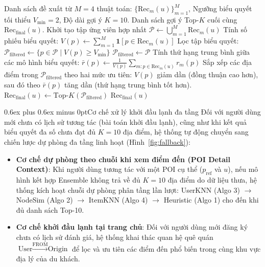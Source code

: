 \documentclass[journal,onecolumn,10pt]{IEEEtran}
\makeatletter
\def\subsection{\@startsection{subsection}{2}{\z@}{1.8ex plus 1.0ex minus 0.3ex}%
{0.6ex plus 0.6ex minus 0pt}{\normalfont\normalsize\bfseries}}
\makeatother
\begin{document}
\begin{algorithm}[htbp]
\caption{Cơ chế biểu quyết đa số và xếp hạng trung bình (Majority Consensus and Mean-Rank Fusion)}
\label{alg:ensemble}
\begin{algorithmic}[1]
\REQUIRE Danh sách đề xuất từ $M=4$ thuật toán: $\{\text{Rec}_m(u)\}_{m=1}^M$, Ngưỡng biểu quyết tối thiểu $V_{\text{min}}=2$, Độ dài gợi ý $K=10$.
\ENSURE Danh sách gợi ý Top-$K$ cuối cùng $\text{Rec}_{\text{final}}(u)$.
\STATE Khởi tạo tập ứng viên hợp nhất $\mathcal{P} \leftarrow \bigcup_{m=1}^M \text{Rec}_m(u)$
    \STATE Tính số phiếu biểu quyết: $V(p) \leftarrow \sum_{m=1}^M \mathbf{1}[p \in \text{Rec}_m(u)]$
\ENDFOR
\STATE Lọc tập biểu quyết: $\mathcal{P}_{\text{filtered}} \leftarrow \{p \in \mathcal{P} \mid V(p) \ge V_{\text{min}}\}$
    \STATE $\mathcal{P}_{\text{filtered}} \leftarrow \mathcal{P}$ 
\ENDIF
{}
    \STATE Tính thứ hạng trung bình giữa các mô hình biểu quyết:
    \STATE $\bar{r}(p) \leftarrow \frac{1}{V(p)} \sum_{m: p \in \text{Rec}_m(u)} r_m(p)$
\ENDFOR
\STATE Sắp xếp các địa điểm trong $\mathcal{P}_{\text{filtered}}$ theo hai mức ưu tiên: $V(p)$ giảm dần (đồng thuận cao hơn), sau đó theo $\bar{r}(p)$ tăng dần (thứ hạng trung bình tốt hơn).
\STATE $\text{Rec}_{\text{final}}(u) \leftarrow \text{Top-}K(\mathcal{P}_{\text{filtered}})$
\RETURN $\text{Rec}_{\text{final}}(u)$
\end{algorithmic}
\end{algorithm}

\subsection{Cơ chế xử lý khởi đầu lạnh đa tầng}
Đối với người dùng mới chưa có lịch sử tương tác (bài toán khởi đầu lạnh), cũng như khi kết quả biểu quyết đa số chưa đạt đủ $K=10$ địa điểm, hệ thống tự động chuyển sang chiến lược dự phòng đa tầng linh hoạt  (Hình~\ref{fig:fallback}):
\begin{itemize}
    \item \textbf{Cơ chế dự phòng theo chuỗi khi xem điểm đến (POI Detail Context)}: Khi người dùng tương tác với một POI cụ thể ($p_{\text{ref}}$ và $u$), nếu mô hình kết hợp Ensemble không trả về đủ $K=10$ địa điểm do dữ liệu thưa, hệ thống kích hoạt chuỗi dự phòng phân tầng lần lượt: UserKNN (Algo 3) $\rightarrow$ NodeSim (Algo 2) $\rightarrow$ ItemKNN (Algo 4) $\rightarrow$ Heuristic (Algo 1) cho đến khi đủ danh sách Top-10.
    \item \textbf{Cơ chế khởi đầu lạnh tại trang chủ}: Đối với người dùng mới đăng ký chưa có lịch sử đánh giá, hệ thống khai thác quan hệ quê quán $\text{User} \xrightarrow{\text{FROM}} \text{Origin}$ để lọc và ưu tiên các điểm đến phổ biến trong cùng khu vực địa lý của du khách.
\end{itemize}
\end{document}
